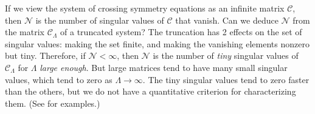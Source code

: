 \documentclass[12pt, a4paper]{article}
\theoremstyle{break}
\begin{document}
If we view the system of crossing symmetry equations as an infinite matrix $\mathcal{C}$, then $\mathcal{N}$ is the number of singular values of $\mathcal{C}$ that vanish. Can we deduce $\mathcal{N}$ from the matrix $\mathcal{C}_\Lambda$ of a truncated system? The truncation has 2 effects on the set of singular values: making the set finite, and making the vanishing elements nonzero but tiny. Therefore, if $\mathcal{N}<\infty$, then $\mathcal{N}$ is the number of \textit{tiny} singular values of $\mathcal{C}_\Lambda$ for $\Lambda$ \textit{large enough}. But large matrices tend to have many small singular values, which tend to zero as $\Lambda\to \infty$. The tiny singular values tend to zero faster than the others, but we do not have a quantitative criterion for characterizing them. (See \cite{gjnrs23} for examples.) 
\end{document}

